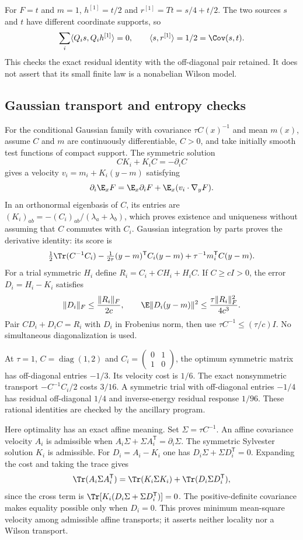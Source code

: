 For $F=t$ and $m=1$, $h^{[1]}=t/2$ and
$r^{[1]}=Tt=s/4+t/2$. The two sources $s$ and $t$ have different
coordinate supports, so
\[
 \sum_i\langle Q_is,Q_ih^{[1]}\rangle=0,
 \qquad \langle s,r^{[1]}\rangle=1/2=\Cov(s,t).
\]
This checks the exact residual identity with the off-diagonal pair
retained. It does not assert that its small finite law is a
nonabelian Wilson model.

\subsection{Gaussian transport and entropy checks}
For the conditional Gaussian family with covariance $\tau C(x)^{-1}$
and mean $m(x)$, assume $C$ and $m$ are continuously differentiable,
$C>0$, and take initially smooth test functions of compact support.
The symmetric solution
\[
 CK_i+K_iC=-\partial_i C
\]
gives a velocity $v_i=m_i+K_i(y-m)$ satisfying
\[
 \partial_i\E_x F=\E_x\partial_iF+\E_x(v_i\cdot\nabla_yF).
\]
In an orthonormal eigenbasis of $C$, its entries are
$(K_i)_{ab}=-(C_i)_{ab}/(\lambda_a+\lambda_b)$, which proves existence
and uniqueness without assuming that $C$ commutes with $C_i$.
Gaussian integration by parts proves the derivative identity: its score is
\[
 \tfrac12\Tr(C^{-1}C_i)
 -\tfrac1{2\tau}(y-m)^{\mathsf T}C_i(y-m)
 +\tau^{-1}m_i^{\mathsf T}C(y-m).
\]
For a trial symmetric $H_i$ define
$R_i=C_i+CH_i+H_iC$. If $C\ge cI>0$, the error
$D_i=H_i-K_i$ satisfies
\[
 \|D_i\|_F\le\frac{\|R_i\|_F}{2c},\qquad
 \E\|D_i(y-m)\|^2\le\frac{\tau\|R_i\|_F^2}{4c^3}.
\]
Pair $CD_i+D_iC=R_i$ with $D_i$ in Frobenius norm, then use
$\tau C^{-1}\le(\tau/c)I$. No simultaneous diagonalization is used.

At $\tau=1$, $C=\operatorname{diag}(1,2)$ and
$C_i=\left(\begin{smallmatrix}0&1\\1&0\end{smallmatrix}\right)$,
the optimum symmetric matrix has off-diagonal entries $-1/3$.
Its velocity cost is $1/6$. The exact nonsymmetric transport
$-C^{-1}C_i/2$ costs $3/16$. A symmetric trial with off-diagonal
entries $-1/4$ has residual off-diagonal $1/4$ and inverse-energy
residual response $1/96$. These rational identities are checked by
the ancillary program.

Here optimality has an exact affine meaning. Set $\Sigma=\tau C^{-1}$.
An affine covariance velocity $A_i$ is admissible when
$A_i\Sigma+\Sigma A_i^{\mathsf T}=\partial_i\Sigma$.
The symmetric Sylvester solution $K_i$ is admissible. For
$D_i=A_i-K_i$ one has $D_i\Sigma+\Sigma D_i^{\mathsf T}=0$.
Expanding the cost and taking the trace gives
\[
 \Tr(A_i\Sigma A_i^{\mathsf T})
 =\Tr(K_i\Sigma K_i)+\Tr(D_i\Sigma D_i^{\mathsf T}),
\]
since the cross term is
$\Tr[K_i(D_i\Sigma+\Sigma D_i^{\mathsf T})]=0$.
The positive-definite covariance makes equality possible only when
$D_i=0$. This proves minimum mean-square velocity among admissible
affine transports; it asserts neither locality nor a Wilson transport.

